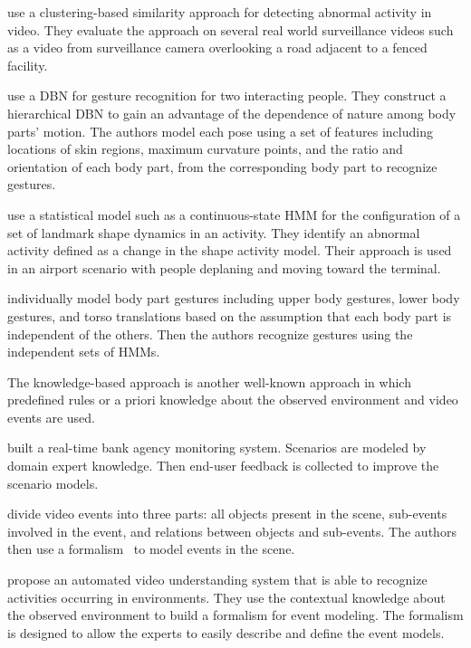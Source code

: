  use a clustering-based similarity approach for
detecting abnormal activity in video. They evaluate the approach on several
real world surveillance videos such as a video from surveillance camera
overlooking a road adjacent to a fenced facility. 

 use a DBN for gesture recognition for two
interacting people. They construct a hierarchical DBN to gain an advantage of
the dependence of nature among body parts' motion.  The authors model each pose
using a set of features including locations of skin regions, maximum curvature
points, and the ratio and orientation of each body part, from the corresponding
body part to recognize gestures.

 use a statistical model such as a
continuous-state HMM for the configuration of a set of landmark shape dynamics
in an activity. They identify an abnormal activity defined as a change in the
shape activity model. Their approach is used in an airport scenario with people
deplaning and moving toward the terminal.

 individually model body part gestures including
upper body gestures, lower body gestures, and torso translations based on the
assumption that each body part is independent of the others. Then the authors
recognize gestures using the independent sets of HMMs.

The knowledge-based approach is another well-known approach in which predefined
rules or a priori knowledge about the observed environment and video events are
used. 

 built a real-time bank agency monitoring system.
Scenarios are modeled by domain expert knowledge. Then end-user feedback is
collected to improve the scenario models. 

 divide video events into three parts: all
objects present in the scene, sub-events involved in the event, and relations
between objects and sub-events. The authors then use a
formalism~ to model events in the scene.

 propose an automated video understanding
system that is able to recognize activities occurring in environments. They use
the contextual knowledge about the observed environment to build a formalism
for event modeling. The formalism is designed to allow the experts to easily
describe and define the event models.

